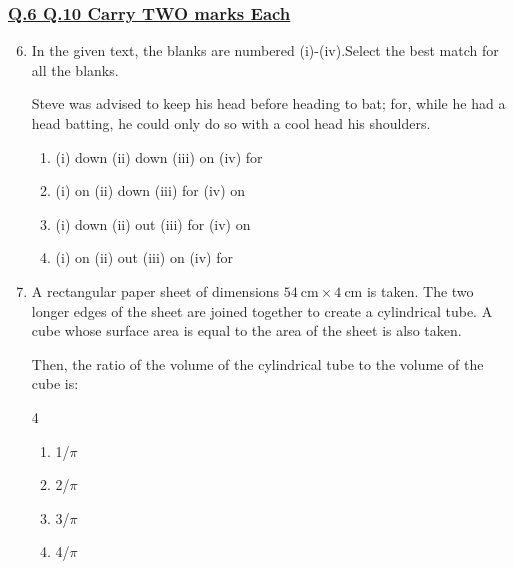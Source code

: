\documentclass[journal]{IEEEtran}
\theoremstyle{remark}
\begin{document}
\subsubsection{\underline{Q.6 \text{-} Q.10 Carry TWO marks Each}}



\begin{enumerate}
\setcounter{enumi}{5}

\item In the given text, the blanks are numbered (i)-(iv).Select the best match for all the blanks. 
\setlength{\parskip}{1em}


Steve was advised to keep his head \underline{} before heading \underline{} to bat;  
for, while he had a head \underline{} batting, he could only do so with a cool head\underline{} his shoulders.

\begin{enumerate}[label=\Alph*), leftmargin=2.5em, labelsep=0.5em, itemsep=0.5em]
    \item (i) down \quad (ii) down \quad (iii) on \quad (iv) for
    \item (i) on \quad (ii) down \quad (iii) for \quad (iv) on
    \item (i) down \quad (ii) out \quad (iii) for \quad (iv) on
    \item (i) on \quad (ii) out \quad (iii) on \quad (iv) for
\end{enumerate}
\end{enumerate}

\begin{enumerate}[itemsep=1em]
\setcounter{enumi}{6}

\item A rectangular paper sheet of dimensions $54\ \text{cm} \times 4\ \text{cm}$ is taken. The two longer edges of the sheet are joined together to create a cylindrical tube. A cube whose surface area is equal to the area of the sheet is also taken.  

Then, the ratio of the volume of the cylindrical tube to the volume of the cube is:
\begin{multicols}{4}
\begin{enumerate}[label=\Alph*)]
      \item 1/$\pi$
      \item 2/$\pi$
      \item 3/$\pi$
      \item 4/$\pi$
\end{enumerate}
\end{multicols}
\end{enumerate}
\end{document}
